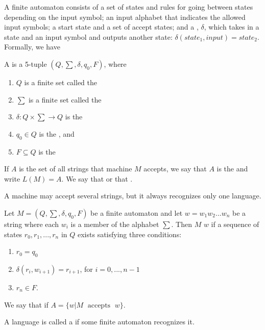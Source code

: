 \documentclass[12pt, a4paper, oneside, openright, titlepage]{book}
\begin{document}
A finite automaton consists of a set of states and rules for going between states depending on the input symbol; an input alphabet that indicates the allowed input symbols; a start state and a set of accept states; and a , $\delta$, which takes in a state and an input symbol and outputs another state: $\delta(state_1,input)= state_2$. Formally, we have 

\begin{defn}
    A  is a 5-tuple $(Q,\sum,\delta,q_0,F)$, where \begin{enumerate}
        \item $Q$ is a finite set called the 
        \item $\sum$ is a finite set called the 
        \item $\delta:Q\times \sum\rightarrow Q$ is the 
        \item $q_0 \in Q$ is the , and 
        \item $F \subseteq Q$ is the 
    \end{enumerate}
\end{defn}

If $A$ is the set of all strings that machine $M$ accepts, we say that $A$ is the  and write $L(M) = A$. We say that  or that .

A machine may accept several strings, but it always recognizes only one language. 

Let $M = (Q,\sum,\delta, q_0, F)$ be a finite automaton and let $w = w_1w_2...w_n$ be a string where each $w_i$ is a member of the alphabet $\sum$. Then $M$  $w$ if a sequence of states $r_0,r_1,...,r_n$ in $Q$ exists satisfying three conditions: \begin{enumerate}
    \item $r_0 = q_0$
    \item $\delta(r_i,w_{i+1}) = r_{i+1}$, for $i = 0,...,n-1$
    \item $r_n \in F$.
\end{enumerate}

We say that  if $A = \{w\vert M\;\text{ accepts }\; w\}$.

\begin{defn}
    A language is called a  if some finite automaton recognizes it.
\end{defn}
\end{document}
